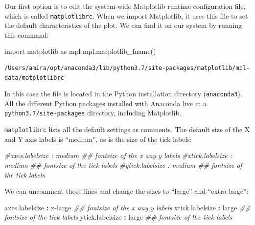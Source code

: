 \documentclass[
]{krantz}
\makeatletter
\newenvironment{Shaded}{\begin{snugshade}}{\end{snugshade}}
\newcommand{\AttributeTok}[1]{\textcolor[rgb]{0.77,0.63,0.00}{#1}}
\newcommand{\CommentTok}[1]{\textcolor[rgb]{0.56,0.35,0.01}{\textit{#1}}}
\newcommand{\FunctionTok}[1]{\textcolor[rgb]{0.00,0.00,0.00}{#1}}
\newcommand{\ImportTok}[1]{#1}
\newcommand{\KeywordTok}[1]{\textcolor[rgb]{0.13,0.29,0.53}{\textbf{#1}}}
\newcommand{\NormalTok}[1]{#1}
\newenvironment{kframe}{%
\medskip{}
\setlength{\fboxsep}{.8em}
 \def\at@end@of@kframe{}%
 \ifinner\ifhmode%
  \def\at@end@of@kframe{\end{minipage}}%
  \begin{minipage}{\columnwidth}%
 \fi\fi%
 \def\FrameCommand##1{\hskip\@totalleftmargin \hskip-\fboxsep
 \colorbox{shadecolor}{##1}\hskip-\fboxsep
     \hskip-\linewidth \hskip-\@totalleftmargin \hskip\columnwidth}%
 \MakeFramed {\advance\hsize-\width
   \@totalleftmargin\z@ \linewidth\hsize
   \@setminipage}}%
 {\par\unskip\endMakeFramed%
 \at@end@of@kframe}
\renewenvironment{Shaded}{\begin{kframe}}{\end{kframe}}
\makeatother
\begin{document}
Our first option is to edit the system-wide Matplotlib runtime configuration file,
which is called \texttt{matplotlibrc}.
When we import Matplotlib,
it uses this file to set the default characteristics of the plot.
We can find it on our system by running this command:

\begin{Shaded}
\begin{Highlighting}[]
\ImportTok{import}\NormalTok{ matplotlib }\ImportTok{as}\NormalTok{ mpl}
\NormalTok{mpl.matplotlib\_fname()}
\end{Highlighting}
\end{Shaded}

\begin{verbatim}
/Users/amira/opt/anaconda3/lib/python3.7/site-packages/matplotlib/mpl-data/matplotlibrc
\end{verbatim}

In this case the file is located in the Python installation directory (\texttt{anaconda3}).
All the different Python packages installed with Anaconda
live in a \texttt{python3.7/site-packages} directory,
including Matplotlib.

\texttt{matplotlibrc} lists all the default settings as comments.
The default size of the X and Y axis labels is ``medium'',
as is the size of the tick labels:

\begin{Shaded}
\begin{Highlighting}[]
\CommentTok{\#axes.labelsize       : medium  \#\# fontsize of the x any y labels}
\CommentTok{\#xtick.labelsize      : medium  \#\# fontsize of the tick labels}
\CommentTok{\#ytick.labelsize      : medium  \#\# fontsize of the tick labels}
\end{Highlighting}
\end{Shaded}

We can uncomment those lines and change the sizes to ``large'' and ``extra large'':

\begin{Shaded}
\begin{Highlighting}[]
\FunctionTok{axes.labelsize       }\KeywordTok{:}\AttributeTok{ x{-}large}\CommentTok{  \#\# fontsize of the x any y labels}
\FunctionTok{xtick.labelsize      }\KeywordTok{:}\AttributeTok{ large}\CommentTok{    \#\# fontsize of the tick labels}
\FunctionTok{ytick.labelsize      }\KeywordTok{:}\AttributeTok{ large}\CommentTok{    \#\# fontsize of the tick labels}
\end{Highlighting}
\end{Shaded}
\end{document}

